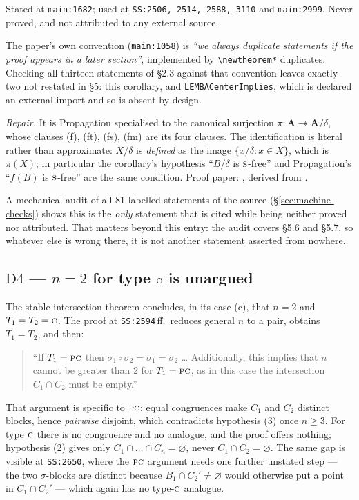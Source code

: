 Stated at \texttt{main:1682}; used at \texttt{SS:2506, 2514, 2588, 3110} and
\texttt{main:2999}. Never proved, and not attributed to any external source.

The paper's own convention (\texttt{main:1058}) is \emph{``we always duplicate
statements if the proof appears in a later section''}, implemented by
\texttt{\textbackslash newtheorem*} duplicates. Checking all thirteen
statements of \S2.3 against that convention leaves exactly two not restated in
\S5: this corollary, and \texttt{LEMBACenterImplies}, which is declared an
external import and so is absent by design.

\emph{Repair.} It is Propagation specialised to the canonical surjection
$\pi\colon\mathbf A\twoheadrightarrow\mathbf A/\delta$, whose clauses (f),
(ft), (fs), (fm) are its four clauses. The identification is literal rather
than approximate: $X/\delta$ is \emph{defined} as the image
$\{x/\delta:x\in X\}$, which is $\pi(X)$; in particular the corollary's
hypothesis ``$B/\delta$ is $\textup{\textsc{s}}$-free'' and Propagation's ``$f(B)$ is
$\textup{\textsc{s}}$-free'' are the same condition. Proof paper: ,
derived from .

A mechanical audit of all $81$ labelled statements of the source
(\S\ref{sec:machine-checks}) shows this is the \emph{only} statement that is
cited while being neither proved nor attributed. That matters beyond this
entry: the audit covers \S5.6 and \S5.7, so whatever else is wrong there, it is
not another statement asserted from nowhere.

\subsection{$\mathrm D4$ --- $n=2$ for type $\textup{\textsc{c}}$ is unargued}\label{sec:D4}

The stable-intersection theorem concludes, in its case (c), that $n=2$ and
$T_{1}=T_{2}=\textup{\textsc{c}}$. The proof at \texttt{SS:2594}\,ff.\ reduces general $n$ to a
pair, obtains $T_{1}=T_{2}$, and then:

\begin{quote}\small
``If $T_{1}=\textup{\textsc{pc}}$ then $\sigma_{1}\circ\sigma_{2}=\sigma_{1}=\sigma_{2}$ \dots
Additionally, this implies that $n$ cannot be greater than 2 for
$T_{1}=\textup{\textsc{pc}}$, as in this case the intersection $C_{1}\cap C_{2}$ must be
empty.''
\end{quote}

That argument is specific to $\textup{\textsc{pc}}$: equal congruences make $C_{1}$ and $C_{2}$
distinct blocks, hence \emph{pairwise} disjoint, which contradicts hypothesis
(3) once $n\ge3$. For type $\textup{\textsc{c}}$ there is no congruence and no analogue, and
the proof offers nothing; hypothesis (2) gives only
$C_{1}\cap\dots\cap C_{n}=\varnothing$, never $C_{1}\cap C_{2}=\varnothing$.
The same gap is visible at \texttt{SS:2650}, where the $\textup{\textsc{pc}}$ argument needs
one further unstated step --- the two $\sigma$-blocks are distinct because
$B_{1}\cap C_{2}'\neq\varnothing$ would otherwise put a point in
$C_{1}\cap C_{2}'$ --- which again has no type-$\textup{\textsc{c}}$ analogue.

